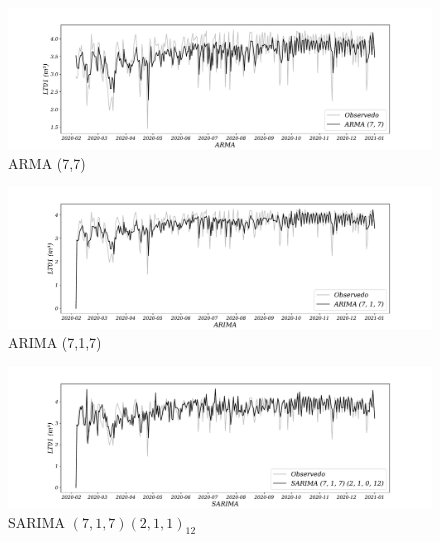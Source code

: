 \begin{figure}[H]
	\centering
	\caption{ARMA (7,7)}
	\label{fig:1-arma}
	\includegraphics[width=1\linewidth]{Modelos/Figuras/ARMA}
	

\end{figure}



\begin{figure}[H]
	\centering
	\caption{ARIMA (7,1,7)}
	\label{fig:1-arima}
	\includegraphics[width=1\linewidth]{Modelos/Figuras/ARIMA}
	
	
\end{figure}




\begin{figure}[H]
	\centering
	\caption{SARIMA $(7,1,7) (2,1,1)_{12}$}
	\label{fig:1-sarima}
	\includegraphics[width=1\linewidth]{Modelos/Figuras/SARIMA}
	

\end{figure}



